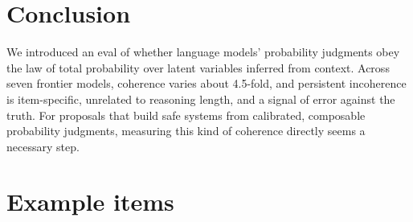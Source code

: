\documentclass[11pt]{article}
\begin{document}
\section{Conclusion}

We introduced an eval of whether language models' probability judgments obey the law of total probability over latent variables inferred from context. Across seven frontier models, coherence varies about 4.5-fold, and persistent incoherence is item-specific, unrelated to reasoning length, and a signal of error against the truth. For proposals that build safe systems from calibrated, composable probability judgments, measuring this kind of coherence directly seems a necessary step.




\clearpage
\appendix

\section{Example items}
\label{app:examples}
\end{document}
